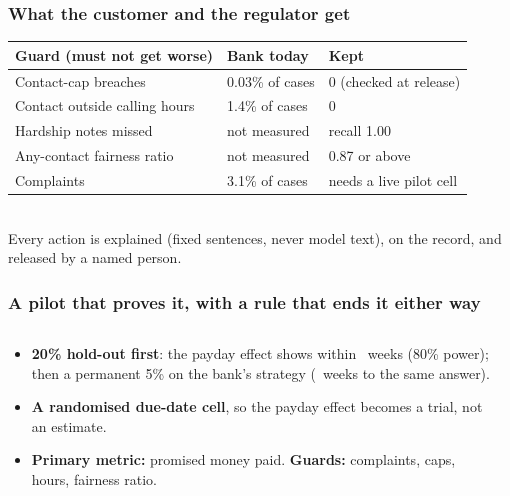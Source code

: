 \documentclass[aspectratio=169,10pt]{beamer}
\begin{document}
\begin{frame}
  \frametitle{What the customer and the regulator get}
  \small
  \begin{tabular}{@{}L{5.0cm}L{3.2cm}L{4.0cm}@{}}
    \toprule
    \textbf{Guard (must not get worse)} & \textbf{Bank today} & \textbf{Kept} \\ \midrule
    Contact-cap breaches & 0.03\% of cases & 0 (checked at release) \\
    Contact outside calling hours & 1.4\% of cases & 0 \\
    Hardship notes missed & not measured & recall 1.00 \\
    Any-contact fairness ratio & not measured & 0.87 or above \\
    Complaints & 3.1\% of cases & needs a live pilot cell \\
    \bottomrule
  \end{tabular}\\[0.8em]
  {\scriptsize Every action is explained (fixed sentences, never model text), on the record, and released by a named person.}
\end{frame}


\begin{frame}
  \frametitle{A pilot that proves it, with a rule that ends it either way}
  \begin{columns}[T]
    \begin{column}{0.48\textwidth}
      \begin{itemize}\setlength\itemsep{0.45em}
        \item \textbf{20\% hold-out first}: the payday effect shows within \KweeksTwenty\ weeks (80\% power); then a permanent 5\% on the bank's strategy (\KweeksFive\ weeks to the same answer).
        \item \textbf{A randomised due-date cell}, so the payday effect becomes a trial, not an estimate.
        \item \textbf{Primary metric:} promised money paid. \textbf{Guards:} complaints, caps, hours, fairness ratio.
      \end{itemize}
    \end{column}
    \begin{column}{0.48\textwidth}
      \\[0.5em]
    \end{column}
  \end{columns}
\end{frame}
\end{document}
